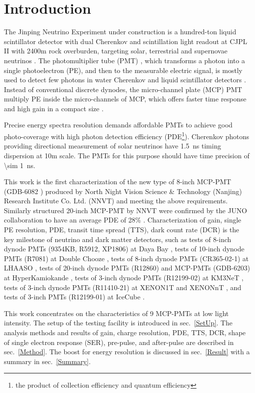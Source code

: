 \section{Introduction}
The Jinping Neutrino Experiment under construction is a hundred-ton liquid scintillator detector with dual Cherenkov and scintillation light readout
 at CJPL II with 2400m rock overburden, targeting solar, terrestrial and supernovae neutrinos \cite{LetterJNE2017}.
The photomultiplier tube (PMT) \cite{HAMAMATSUManual}, which transforms a photon into a single photoelectron (PE), and then to the measurable electric signal, is mostly used to detect few photons in water Cherenkov \cite{SNO,SuperK} and liquid scintillator detectors \cite{KamLAND,JUNO:2015zny}. Instead of conventional discrete dynodes, the micro-channel plate (MCP) PMT multiply PE inside the micro-channels of MCP, which offers faster time response and high gain in a compact size \cite{HAMAMATSUManual}.

Precise energy spectra resolution demands affordable PMTs to achieve good photo-coverage with high photon detection efficiency (PDE\footnote{the product of collection efficiency and quantum efficiency}). Cherenkov photons providing directional measurement of solar neutrinos have \SI{1.5}{ns} timing dispersion at 10m scale. The PMTs for this purpose should have time precision of \SI{\sim 1}{ns}.


This work is the first characterization of
 the new type of 8-inch MCP-PMT (GDB-6082 \cite{GDB-6082}) produced by North Night Vision Science \& Technology (Nanjing) Research Institute Co. Ltd. (NNVT) and meeting the above requirements. %
Similarly structured 20-inch MCP-PMT by NNVT were confirmed by the JUNO collaboration to have an average PDE of 28\% \cite{JUNOMassTesting}.
Characterization of gain, single PE resolution, PDE, transit time spread (TTS), dark count rate (DCR) is the key milestone of neutrino and dark matter detectors, such as tests of
 8-inch dynode PMTs (9354KB, R5912, XP1806) at Daya Bay \cite{DayaBayTesting}, tests of 10-inch dynode PMTs (R7081) at Double Chooze \cite{DoubleChoozeTesting}, tests of 8-inch dynode PMTs (CR365-02-1) at LHAASO \cite{LHAASOTesting}, tests of 20-inch dynode PMTs (R12860) and MCP-PMTs (GDB-6203) at HyperKamiokande \cite{HyperKTesting}, tests of 3-inch dynode PMTs (R12199-02) at KM3NeT \cite{KM3NetTesting}, tests of 3-inch dynode PMTs (R11410-21) at XENON1T and XENONnT \cite{XENON1TTesting}\cite{XENONnTTesting}, and tests of 3-inch PMTs (R12199-01) at IceCube \cite{IceCubeTesting}.

This work concentrates on the characteristics of 9 MCP-PMTs at low light intensity. The setup of the testing facility is introduced in sec.~\ref{SetUp}. The analysis methods and results of gain, charge resolution, PDE, TTS, DCR, shape of single electron response (SER), pre-pulse, and after-pulse are described in sec.~\ref{Method}. The boost for energy resolution is discussed in sec.~\ref{Result} with a summary in sec.~\ref{Summary}.
